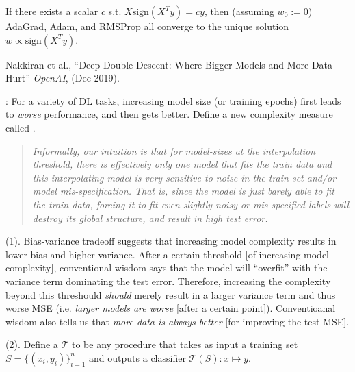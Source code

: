\documentclass[11pt]{article}
\begin{document}
\begin{definition}[-1em][Lemma 3.1]
	If there exists a scalar $c$ s.t. $X \text{sign}(X^T y) = cy$, then (assuming $w_0 := 0$) AdaGrad, Adam, and RMSProp all converge to the unique solution $w \propto \text{sign}(X^T y)$.
\end{definition}








\vspace{-1em}
{\footnotesize Nakkiran et al., ``Deep Double Descent: Where Bigger Models and More Data Hurt'' \textit{OpenAI}, (Dec 2019).}


: For a variety of DL tasks, increasing model size (or training epochs) first leads to \textit{worse} performance, and then gets better. Define a new complexity measure called . 
\vspace{-0.5em}
\begin{quote}
	{\small\itshape
		Informally, our intuition is that for model-sizes at the interpolation threshold, there is effectively only one model that fits the train data and this interpolating model is very sensitive to noise in the train set and/or model mis-specification. That is, since the model is just barely able to fit the train data, forcing it to fit even slightly-noisy or mis-specified labels will destroy its global structure, and result in high test error.
	}
\end{quote}

 (1). Bias-variance tradeoff suggests that increasing model complexity results in lower bias and higher variance. After a certain threshold [of increasing model complexity], conventional wisdom says that the model will ``overfit'' with the variance term dominating the test error. Therefore, increasing the complexity beyond this threshould \textit{should} merely result in a larger variance term and thus worse MSE (i.e. \textit{larger models are worse} [after a certain point]). Conventioanal wisdom also tells us that \textit{more data is always better} [for improving the test MSE]. 

 (2). Define a  $\mathcal T$ to be any procedure that takes as input a training set $S = \{(x_i, y_i)\}_{i=1}^{n}$ and outputs a classifier $\mathcal T(S) : x \mapsto y$. 
\end{document}
